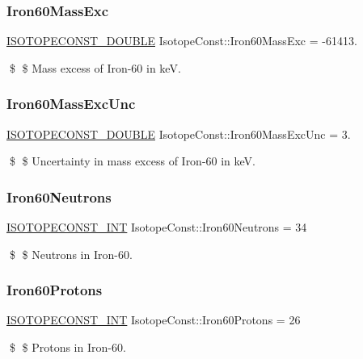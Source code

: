 \subsubsection{\texorpdfstring{Iron60\+Mass\+Exc}{Iron60MassExc}}
{\footnotesize\ttfamily \mbox{\hyperlink{group___isotope_const-_macros_ga8f45a7272ce02c0b4c65c44636ed719a}{I\+S\+O\+T\+O\+P\+E\+C\+O\+N\+S\+T\+\_\+\+D\+O\+U\+B\+LE}} Isotope\+Const\+::\+Iron60\+Mass\+Exc = -\/61413.}

\$ \$ Mass excess of Iron-\/60 in keV. \mbox{\label{group___isotope_const-_iron-_fe60_ga15de2f8bb34888ef6bd9adc5d5ceb8f5}} 
\subsubsection{\texorpdfstring{Iron60\+Mass\+Exc\+Unc}{Iron60MassExcUnc}}
{\footnotesize\ttfamily \mbox{\hyperlink{group___isotope_const-_macros_ga8f45a7272ce02c0b4c65c44636ed719a}{I\+S\+O\+T\+O\+P\+E\+C\+O\+N\+S\+T\+\_\+\+D\+O\+U\+B\+LE}} Isotope\+Const\+::\+Iron60\+Mass\+Exc\+Unc = 3.}

\$ \$ Uncertainty in mass excess of Iron-\/60 in keV. \mbox{\label{group___isotope_const-_iron-_fe60_ga2a0183288f77a48ea72f6b10fd9e787b}} 
\subsubsection{\texorpdfstring{Iron60\+Neutrons}{Iron60Neutrons}}
{\footnotesize\ttfamily \mbox{\hyperlink{group___isotope_const-_macros_ga5f18360b3e99483a35c32d789e62621c}{I\+S\+O\+T\+O\+P\+E\+C\+O\+N\+S\+T\+\_\+\+I\+NT}} Isotope\+Const\+::\+Iron60\+Neutrons = 34}

\$ \$ Neutrons in Iron-\/60. \mbox{\label{group___isotope_const-_iron-_fe60_ga850123454c3847cbe199ed0eb415cc77}} 
\subsubsection{\texorpdfstring{Iron60\+Protons}{Iron60Protons}}
{\footnotesize\ttfamily \mbox{\hyperlink{group___isotope_const-_macros_ga5f18360b3e99483a35c32d789e62621c}{I\+S\+O\+T\+O\+P\+E\+C\+O\+N\+S\+T\+\_\+\+I\+NT}} Isotope\+Const\+::\+Iron60\+Protons = 26}

\$ \$ Protons in Iron-\/60. 